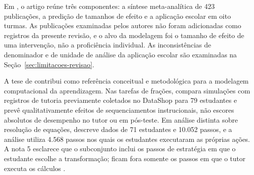 Em , o artigo reúne três componentes: a síntese meta-analítica de 423 publicações, a predição de tamanhos de efeito e a aplicação escolar em oito turmas. As publicações examinadas pelos autores não foram adicionadas como registros da presente revisão, e o alvo da modelagem foi o tamanho de efeito de uma intervenção, não a proficiência individual. As inconsistências de denominador e de unidade de análise da aplicação escolar são examinadas na Seção~\ref{sec:limitacoes-revisao}.

A tese de  contribui como referência conceitual e metodológica para a modelagem computacional da aprendizagem. Nas tarefas de frações, compara simulações com registros de tutoria previamente coletados no DataShop para 79 estudantes e prevê qualitativamente efeitos de sequenciamentos instrucionais, não escores absolutos de desempenho no tutor ou em pós-teste. Em análise distinta sobre resolução de equações, descreve dados de 71 estudantes e 10.052 passos, e a análise utiliza 4.568 passos nos quais os estudantes executaram as próprias ações. A nota 5 esclarece que o subconjunto inclui os passos de estratégia em que o estudante escolhe a transformação; ficam fora somente os passos em que o tutor executa os cálculos \cite{Computational2017_008}.

